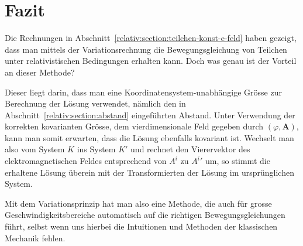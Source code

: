 
\section{Fazit 
\label{relativ:section:fazit}}

Die Rechnungen in Abschnitt~\ref{relativ:section:teilchen-konst-e-feld}
haben gezeigt, dass man mittels der Variationsrechnung
die Bewegungsgleichung von Teilchen unter relativistischen
Bedingungen erhalten kann.
Doch was genau ist der Vorteil an dieser Methode?

Dieser liegt darin, dass man eine
Koordinatensystem-unabhängige Grösse zur Berechnung
der Lösung verwendet, nämlich den in Abschnitt~\ref{relativ:section:abstand}
eingeführten Abstand.
Unter Verwendung der korrekten kovarianten Grösse,
%
dem vierdimensionale Feld gegeben durch \((\varphi, \bm{A})\),
kann man somit erwarten, dass die Lösung ebenfalls kovariant ist.
Wechselt man also vom System \(K\) ins System \(K'\) und
rechnet den Vierervektor des elektromagnetischen Feldes entsprechend
von \(A^i\) zu \({A^i}'\) um, so stimmt die erhaltene Lösung
überein mit der Transformierten der Lösung im ursprünglichen System.

Mit dem Variationsprinzip hat man also eine Methode,
die auch für grosse Geschwindigkeitsbereiche automatisch
auf die richtigen Bewegungsgleichungen führt, selbst wenn uns
hierbei die Intuitionen und Methoden der klassischen Mechanik fehlen.
